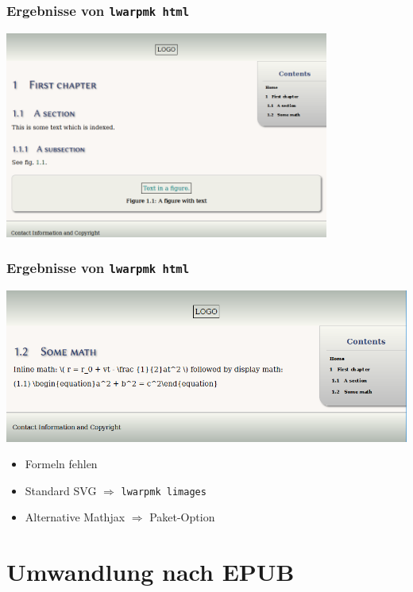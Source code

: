 \documentclass[12pt,ngerman]{beamer}
\begin{document}
\begin{frame}
\frametitle{Ergebnisse von \texttt{lwarpmk html}}

\begin{center}
\includegraphics[width=0.8\textwidth]{lwarp-manual-example/bild-02.png}
\end{center}

\end{frame}


\begin{frame}
\frametitle{Ergebnisse von \texttt{lwarpmk html}}

\begin{center}
\includegraphics[width=\textwidth]{lwarp-manual-example/bild-03.png}
\end{center}

\begin{itemize}
	\item Formeln fehlen
	\item Standard SVG $\Rightarrow$ \texttt{lwarpmk limages}
	\item Alternative Mathjax $\Rightarrow$ Paket-Option
\end{itemize}

\end{frame}

\section{Umwandlung nach EPUB}
\end{document}
